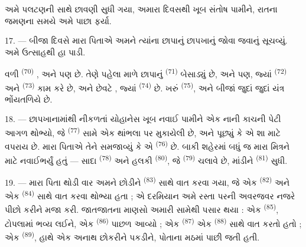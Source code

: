 અમે પલટણની સાથે છાવણી સુધી ગયા,  અમારા દિવસથી ખૂબ સંતોષ
પામીને, રાતના જમણના સમયે અમે પાછા ફર્યા.

\VUsaut{3.0mm}

17. --- બીજા દિવસે મારા પિતાએ અમને ત્યાંના છાપાનું છાપખાનું જોવા
જવાનું સૂચવ્યું. અમે ઉત્સાહથી હા પાડી.

 વળી  \textsuperscript{(70)}
 , 
અને  પણ છે. તેણે પહેલા માળે છાપાનું
 \textsuperscript{(71)} બેસાડ્યું છે, અને
 પણ, જ્યાં 
\textsuperscript{(72)} અને 
\textsuperscript{(73)} કામ કરે છે, અને છેવટે , જ્યાં  \textsuperscript{(74)} છે. ખરું
 \textsuperscript{(75)},  અને
બીજાં જુદાં જુદાં યંત્ર ભોંયતળિયે છે.

\VUsaut{3.0mm}

18. --- છાપખાનામાંથી નીકળતાં યોહાનેસ ખૂબ નવાઈ પામીને એક નાની કાચની
પેટી આગળ થોભ્યો, જે  \textsuperscript{(77)}
સામે એક થાંભલા પર મુકાયેલી છે, અને પૂછ્યું કે એ શા માટે વપરાય છે.
મારા પિતાએ તેને સમજાવ્યું કે એ 
\textsuperscript{(76)} છે. બાકી શહેરમાં બધું જ મારા મિત્રને માટે
નવાઈભર્યું હતું — સાદા  \textsuperscript{(78)}
અને હલકી 
\textsuperscript{(80)}, જે 
\textsuperscript{(79)} ચલાવે છે, માંડીને
 \textsuperscript{(81)} સુધી.

19. --- મારા પિતા થોડી વાર અમને છોડીને  \textsuperscript{(83)} સાથે વાત કરવા ગયા, જે એક 
\textsuperscript{(82)} અને એક  \textsuperscript{(84)}
સાથે વાત કરવા થોભ્યા હતા ; એ દરમિયાન અમે રસ્તા પરની અવરજવર નજરે
પીછો કરીને મજા કરી. જાતજાતના માણસો અમારી સામેથી પસાર થયા : એક
 \textsuperscript{(85)}, ટોપલામાં ભવ્ય
 લઈને, એક 
\textsuperscript{(86)} પાછળ આવ્યો ; એક 
\textsuperscript{(87)} એક  \textsuperscript{(88)} સાથે
વાત કરતો હતો ; એક  \textsuperscript{(89)}, હાથે એક અનાથ
છોકરીને પકડીને, પોતાના મઠમાં પાછી જતી હતી.

